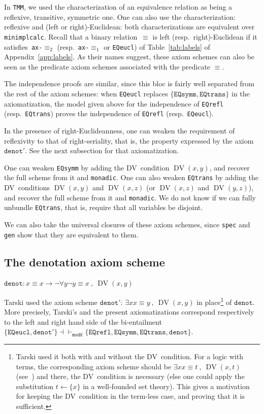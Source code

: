\documentclass[11pt]{article}
\newcommand*{\comma}{\:,\:}
\DeclareMathOperator{\DV}{DV}
\theoremstyle{plain}
\theoremstyle{definition}
\theoremstyle{remark}
\begin{document}
In \texttt{TMM}, we used the characterization of an equivalence relation as being a reflexive, transitive, symmetric one.
One can also use the characterization: reflexive and (left or right)-Euclidean: both characterizations are equivalent over \texttt{minimplcalc}.
Recall that a binary relation~$\equiv$ is left (resp.\ right)-Euclidean if it satisfies~\texttt{ax-$\equiv_2$} (resp.~\texttt{ax-$\equiv_1$} or \texttt{EQeucl}) of Table~\ref{tab:labels} of Appendix~\ref{app:labels}.
As their names suggest, these axiom schemes can also be seen as the predicate axiom schemes associated with the predicate $\equiv$.

The independence proofs are similar, since this bloc is fairly well separated from the rest of the axiom schemes: when \texttt{EQeucl} replaces $\{ \texttt{EQsymm}, \texttt{EQtrans} \}$ in the axiomatization, the model given above for the independence of \texttt{EQrefl} (resp.\ \texttt{EQtrans}) proves the independence of \texttt{EQrefl} (resp.\ \texttt{EQeucl}).

In the presence of right-Euclideanness, one can weaken the requirement of reflexivity to that of right-seriality, that is, the property expressed by the axiom $\texttt{denot}'$.
See the next subsection for that axiomatization.

One can weaken \texttt{EQsymm} by adding the DV~condition $\DV(x, y)$, and recover the full scheme from it and \texttt{monadic}.
One can also weaken \texttt{EQtrans} by adding the DV~conditions $\DV(x, y)$ and $\DV(x, z)$ (or $\DV(x, z)$ and $\DV(y, z)$), and recover the full scheme from it and \texttt{monadic}.
We do not know if we can fully unbundle \texttt{EQtrans}, that is, require that all variables be disjoint.


We can also take the universal closures of these axiom schemes, since \texttt{spec} and \texttt{gen} show that they are equivalent to them.


\subsection{The denotation axiom scheme}

$\texttt{denot}:
x \equiv x \to \neg\forall y \neg y \equiv x \comma \DV(x, y)$
\vspace{0.5em}

Tarski used the axiom scheme $\texttt{denot}'$: $\exists x x \equiv y \comma \DV(x, y)$ in place\footnote{Tarski
used it both with and without the DV~condition.
For a logic with terms, the corresponding axiom scheme should be $\exists x x \equiv t \comma \DV(x, t)$ (see~\cite[\S~4]{km}) and there, the DV~condition is necessary (else one could apply the substitution $t \leftarrow \{x\}$ in a well-founded set theory).
This gives a motivation for keeping the DV~condition in the term-less case, and proving that it is sufficient.}
of $\texttt{denot}$.
More precisely, Tarski's and the present axiomatizations correspond respectively to the left and right hand side of the bi-entailment $\{\texttt{EQeucl}, \texttt{denot}'\} \dashv\vdash_\texttt{modK} \{\texttt{EQrefl}, \texttt{EQsymm},  \texttt{EQtrans}, \texttt{denot}\}$.
\end{document}
